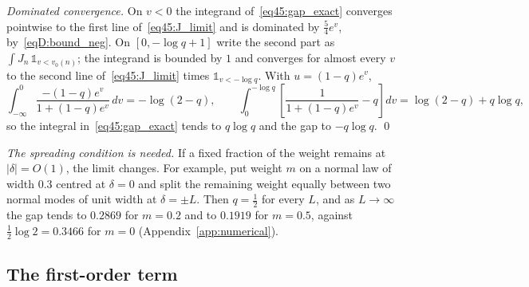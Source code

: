 \documentclass[11pt,letterpaper]{article}
\theoremstyle{plain}
\theoremstyle{definition}
\theoremstyle{remark}
\begin{document}
\emph{Dominated convergence.} On $v < 0$ the integrand of~\eqref{eq45:gap_exact} converges pointwise to the first line of~\eqref{eq45:J_limit} and is dominated by $\tfrac54 e^{v}$, by~\eqref{eqD:bound_neg}. On $[0, -\log q + 1]$ write the second part as $\int J_n\, \mathbb{1}_{v < v_0(n)}$; the integrand is bounded by $1$ and converges for almost every $v$ to the second line of~\eqref{eq45:J_limit} times $\mathbb{1}_{v < -\log q}$. With $u = (1-q)e^{v}$,
\begin{equation}
\int_{-\infty}^0 \frac{-(1-q)e^{v}}{1 + (1-q)e^{v}}\, dv = -\log(2 - q), \qquad
\int_0^{-\log q}\left[\frac{1}{1 + (1-q)e^{v}} - q\right] dv = \log(2-q) + q\log q,
\end{equation}
so the integral in~\eqref{eq45:gap_exact} tends to $q\log q$ and the gap to $-q\log q$. \qed

\emph{The spreading condition is needed.} If a fixed fraction of the weight remains at $|\delta| = O(1)$, the limit changes. For example, put weight $m$ on a normal law of width $0.3$ centred at $\delta = 0$ and split the remaining weight equally between two normal modes of unit width at $\delta = \pm L$. Then $q = \tfrac12$ for every $L$, and as $L \to \infty$ the gap tends to $0.2869$ for $m = 0.2$ and to $0.1919$ for $m = 0.5$, against $\tfrac12\log 2 = 0.3466$ for $m = 0$ (Appendix~\ref{app:numerical}).

\subsection{The first-order term}
\label{subsecD:first_order}
\end{document}
